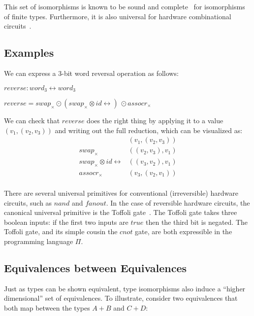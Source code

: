 \documentclass[sigplan,review,anonymous]{acmart}
\newcommand{\prodtype}{\times}
\newcommand{\swapt}{\ensuremath{\mathit{swap}_{\prodtype}}}
\newcommand{\assocrt}{\ensuremath{\mathit{assocr}_{\prodtype}}}
\newcommand{\idc}{\mathit{id}\!\!\leftrightarrow}
\begin{document}
This set of isomorphisms is known to be sound and
complete~\cite{Fiore:2004,fiore-remarks} for isomorphisms
of finite types.  Furthermore, it is also universal
for hardware combinational
circuits~\cite{James:2012:IE:2103656.2103667}.

\subsection{Examples}
We can express a 3-bit word reversal operation as follows:

\ensuremath{\mathit{reverse} : \mathit{word}_3 \leftrightarrow \mathit{word}_3}

\ensuremath{\mathit{reverse} = \swapt \odot (\swapt  \otimes  \idc)~ \odot \assocrt}

\noindent We can check that \ensuremath{\mathit{reverse}} does the right thing by
applying it to a value \ensuremath{(v_1, (v_2, v_3))} and writing out the full
reduction, which can be visualized as:
\[\begin{array}{rlr}
 & (v_1, (v_2, v_3)) \\
 \swapt & ((v_2, v_3), v_1) \\
 \swapt \otimes  \idc & ((v_3, v_2), v_1) \\
 \assocrt & (v_3, (v_2, v_1)) \\
 \end{array}\]

There are several universal primitives for conventional (irreversible)
hardware circuits, such as \ensuremath{\mathit{nand}} and \ensuremath{\mathit{fanout}}. In the case
of reversible hardware circuits, the canonical universal primitive is
the Toffoli gate~\cite{Toffoli:1980}. The Toffoli gate takes three
boolean inputs: if the first two inputs are \ensuremath{\mathit{true}} then the third
bit is negated. The Toffoli gate, and its simple cousin the $\mathit{cnot}$ gate, are both
expressible in the programming language $\Pi$.

\subsection{Equivalences between Equivalences}
\label{sec:pi2}

Just as types can be shown equivalent, type isomorphisms
also induce a ``higher dimensional'' set of equivalences.
To illustrate, consider two equivalences that both
map between the types $A + B$ and $C+D$:
\end{document}
